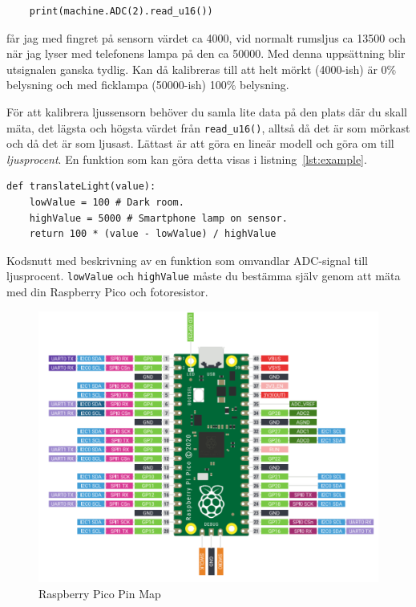 \documentclass{article}
\begin{document}
\begin{verbatim}
    print(machine.ADC(2).read_u16())
\end{verbatim}
får jag med fingret på sensorn värdet ca 4000, vid normalt rumsljus ca 13500 och när jag lyser med telefonens lampa på den ca 50000. Med denna uppsättning blir utsignalen ganska tydlig. Kan då kalibreras till att helt mörkt (4000-ish) är 0\% belysning och med ficklampa (50000-ish) 100\% belysning. 

För att kalibrera ljussensorn behöver du samla lite data på den plats där du skall mäta, det lägsta och högsta värdet från \texttt{read\_u16()}, alltså då det är som mörkast och då det är som ljusast. Lättast är att göra en lineär modell och göra om till \emph{ljusprocent}. En funktion som kan göra detta visas i listning~\ref{lst:example}. 

\begin{listing}[H]
\begin{verbatim}
def translateLight(value):
    lowValue = 100 # Dark room.
    highValue = 5000 # Smartphone lamp on sensor.
    return 100 * (value - lowValue) / highValue
\end{verbatim}
\caption{Kodsnutt med beskrivning av en funktion som omvandlar ADC-signal till ljusprocent. \texttt{lowValue} och \texttt{highValue} måste du bestämma själv genom att mäta med din Raspberry Pico och fotoresistor.}
\label{lst:example}
\end{listing}



%




\begin{figure}[!h]
    \centering
    \includegraphics[width = \textwidth]{picopinout.png}
    \caption{Raspberry Pico Pin Map}
    \label{fig:Pico}
\end{figure}
\end{document}
